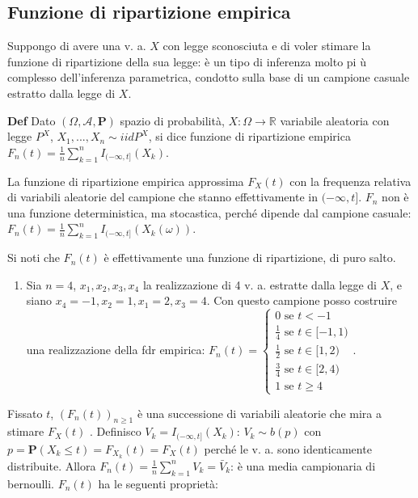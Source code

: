 \documentclass{article}
\begin{document}
\subsection{Funzione di ripartizione empirica}

Suppongo di avere una v. a. $X$ con legge sconosciuta e di voler stimare la
funzione di ripartizione della sua legge: \`{e} un tipo di inferenza molto pi%
\`{u} complesso dell'inferenza parametrica, condotto sulla base di un
campione casuale estratto dalla legge di $X$.

\textbf{Def} Dato $\left( \Omega ,\mathcal{A},\mathbf{P}\right) $ spazio di
probabilit\`{a}, $X:\Omega \rightarrow 
\mathbb{R}
$ variabile aleatoria con legge $P^{X}$, $X_{1},...,X_{n}\sim iidP^{X}$, si
dice funzione di ripartizione empirica $F_{n}\left( t\right) =\frac{1}{n}%
\sum_{k=1}^{n}I_{(-\infty ,t]}\left( X_{k}\right) $.

La funzione di ripartizione empirica approssima $F_{X}\left( t\right) $ con
la frequenza relativa di variabili aleatorie del campione che stanno
effettivamente in $(-\infty ,t]$. $F_{n}$ non \`{e} una funzione
deterministica, ma stocastica, perch\'{e} dipende dal campione casuale: $%
F_{n}\left( t\right) =\frac{1}{n}\sum_{k=1}^{n}I_{(-\infty ,t]}\left(
X_{k}\left( \omega \right) \right) $.

Si noti che $F_{n}\left( t\right) $ \`{e} effettivamente una funzione di
ripartizione, di puro salto.

\begin{enumerate}
\item Sia $n=4$, $x_{1},x_{2},x_{3},x_{4}$ la realizzazione di 4 v. a.
estratte dalla legge di $X$, e siano $x_{4}=-1,x_{2}=1,x_{1}=2,x_{3}=4$. Con
questo campione posso costruire una realizzazione della fdr empirica: $%
F_{n}\left( t\right) =\left\{ 
\begin{array}{c}
0\text{ se }t<-1 \\ 
\frac{1}{4}\text{ se }t\in \lbrack -1,1) \\ 
\frac{1}{2}\text{ se }t\in \lbrack 1,2) \\ 
\frac{3}{4}\text{ se }t\in \lbrack 2,4) \\ 
1\text{ se }t\geq 4%
\end{array}%
\right. $.
\end{enumerate}

Fissato $t$, $\left( F_{n}\left( t\right) \right) _{n\geq 1}$ \`{e} una
successione di variabili aleatorie che mira a stimare $F_{X}\left( t\right) $%
. Definisco $V_{k}=I_{(-\infty ,t]}\left( X_{k}\right) $: $V_{k}\sim b\left(
p\right) $ con $p=\mathbf{P}\left( X_{k}\leq t\right) =F_{X_{k}}\left(
t\right) =F_{X}\left( t\right) $ perch\'{e} le v. a. sono identicamente
distribuite. Allora $F_{n}\left( t\right) =\frac{1}{n}\sum_{k=1}^{n}V_{k}=%
\bar{V}_{k}$: \`{e} una media campionaria di bernoulli. $F_{n}\left(
t\right) $ ha le seguenti propriet\`{a}:
\end{document}
